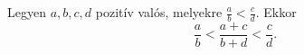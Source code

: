 Legyen $a,b,c,d$ pozitív valós, melyekre $\frac{a}{b}<\frac{c}{d}.$ Ekkor
$$
\frac{a}{b} < \frac{a+c}{b+d} < \frac{c}{d}.
$$
